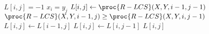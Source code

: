 \begin{codebox}
\li \If $L[i,j] = -1$
\li \Then \If $x_i = y_j$
\li 	\Then $L[i,j] \gets \proc{R-LCS}(X,Y,i-1,j-1)$
\li		\ElseIf $\proc{R-LCS}(X,Y,i-1,j) \geq \proc{R-LCS}(X,Y,i,j-1)$
\li		\Then $L[i,j] \gets L[i-1,j]$
\li		\ElseNoIf
\li			$L[i,j] \gets L[i,j-1]$
		\End
	\End
\li \Return $L[i,j]$
\end{codebox}